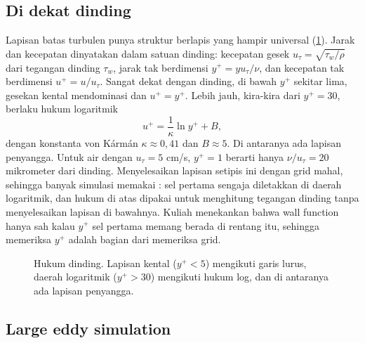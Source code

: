 \subsection{Di dekat dinding}

Lapisan batas turbulen punya struktur berlapis yang hampir universal (\cref{fig:loglaw}). Jarak dan
kecepatan dinyatakan dalam satuan dinding: kecepatan gesek $u_\tau=\sqrt{\tau_w/\rho}$ dari tegangan dinding
$\tau_w$, jarak tak berdimensi $y^+=yu_\tau/\nu$, dan kecepatan tak berdimensi $u^+=u/u_\tau$. Sangat dekat
dengan dinding, di bawah $y^+$ sekitar lima, gesekan kental mendominasi dan $u^+=y^+$. Lebih jauh, kira-kira dari
$y^+=30$, berlaku hukum logaritmik
\begin{equation}
u^+=\frac1\kappa\ln y^++B,
\end{equation}
dengan konstanta von Kármán $\kappa\approx0{,}41$ dan $B\approx5$. Di antaranya ada lapisan penyangga. Untuk air
dengan $u_\tau=5$ cm/s, $y^+=1$ berarti hanya $\nu/u_\tau=20$ mikrometer dari dinding. Menyelesaikan lapisan
setipis ini dengan grid mahal, sehingga banyak simulasi memakai : sel pertama sengaja
diletakkan di daerah logaritmik, dan hukum di atas dipakai untuk menghitung tegangan dinding tanpa
menyelesaikan lapisan di bawahnya. Kuliah menekankan bahwa wall function hanya sah kalau $y^+$ sel pertama
memang berada di rentang itu, sehingga memeriksa $y^+$ adalah bagian dari memeriksa grid.

\begin{figure}[ht]
\centering
{}
\caption{Hukum dinding. Lapisan kental ($y^+<5$) mengikuti garis lurus, daerah logaritmik ($y^+>30$) mengikuti
hukum log, dan di antaranya ada lapisan penyangga.}
\label{fig:loglaw}
\end{figure}

\subsection{Large eddy simulation}

